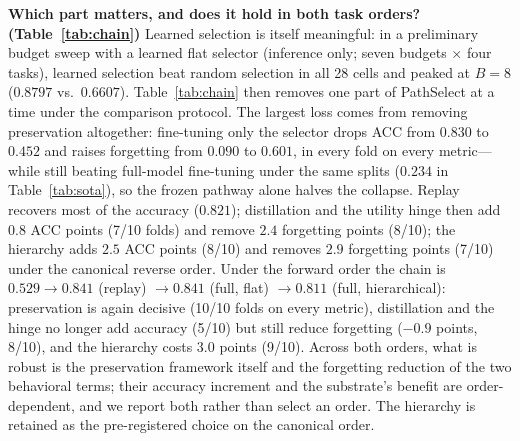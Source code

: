 \documentclass{article}
\begin{document}
\textbf{Which part matters, and does it hold in both task orders? (Table~\ref{tab:chain})}
Learned selection is itself meaningful: in a preliminary budget sweep with a learned flat selector (inference only; seven budgets $\times$ four tasks), learned selection beat random selection in all 28 cells and peaked at $B=8$ ($0.8797$ vs.\ $0.6607$). Table~\ref{tab:chain} then removes one part of PathSelect at a time under the comparison protocol. The largest loss comes from removing preservation altogether: fine-tuning only the selector drops ACC from $0.830$ to $0.452$ and raises forgetting from $0.090$ to $0.601$, in every fold on every metric---while still beating full-model fine-tuning under the same splits ($0.234$ in Table~\ref{tab:sota}), so the frozen pathway alone halves the collapse. Replay recovers most of the accuracy ($0.821$); distillation and the utility hinge then add $0.8$ ACC points (7/10 folds) and remove $2.4$ forgetting points (8/10); the hierarchy adds $2.5$ ACC points (8/10) and removes $2.9$ forgetting points (7/10) under the canonical reverse order. Under the forward order the chain is $0.529\rightarrow0.841$ (replay) $\rightarrow0.841$ (full, flat) $\rightarrow0.811$ (full, hierarchical): preservation is again decisive (10/10 folds on every metric), distillation and the hinge no longer add accuracy (5/10) but still reduce forgetting ($-0.9$ points, 8/10), and the hierarchy costs $3.0$ points (9/10). Across both orders, what is robust is the preservation framework itself and the forgetting reduction of the two behavioral terms; their accuracy increment and the substrate's benefit are order-dependent, and we report both rather than select an order. The hierarchy is retained as the pre-registered choice on the canonical order.

\begin{table}[t]
\centering
\footnotesize
\caption{\textbf{Preservation-component ablation} (flat, fold 1, 5-seed means). Replay restores task attribution, the utility hinge assigns credit, distillation stabilizes scoring; no single term or pair matches the full set.}
\label{tab:ablation}
\end{table}
\end{document}
